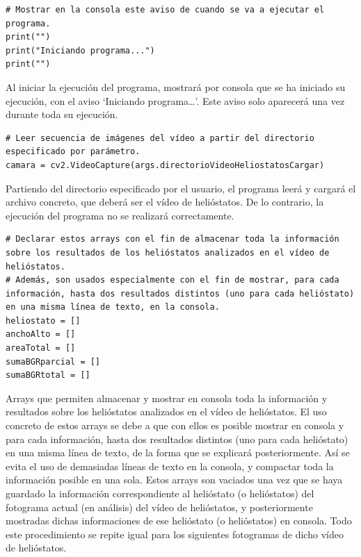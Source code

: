 \begin{lstlisting}
# Mostrar en la consola este aviso de cuando se va a ejecutar el programa.
print("")
print("Iniciando programa...")
print("")
\end{lstlisting}

Al iniciar la ejecución del programa, mostrará por consola que se ha iniciado su ejecución, con el aviso ‘Iniciando programa…’. Este aviso solo aparecerá una vez durante toda su ejecución.\\[20pt]

\begin{lstlisting}
# Leer secuencia de imágenes del vídeo a partir del directorio especificado por parámetro.
camara = cv2.VideoCapture(args.directorioVideoHeliostatosCargar)
\end{lstlisting}

Partiendo del directorio especificado por el usuario, el programa leerá y cargará el archivo concreto, que deberá ser el vídeo de helióstatos. De lo contrario, la ejecución del programa no se realizará correctamente.\\[20pt]

\begin{lstlisting}
# Declarar estos arrays con el fin de almacenar toda la información sobre los resultados de los helióstatos analizados en el vídeo de helióstatos.
# Además, son usados especialmente con el fin de mostrar, para cada información, hasta dos resultados distintos (uno para cada helióstato) en una misma línea de texto, en la consola.
heliostato = []
anchoAlto = []
areaTotal = []
sumaBGRparcial = []
sumaBGRtotal = []
\end{lstlisting}

Arrays que permiten almacenar y mostrar en consola toda la información y resultados sobre los helióstatos analizados en el vídeo de helióstatos. El uso concreto de estos arrays se debe a que con ellos es posible mostrar en consola y para cada información, hasta dos resultados distintos (uno para cada helióstato) en una misma línea de texto, de la forma que se explicará posteriormente. Así se evita el uso de demasiadas líneas de texto en la consola, y compactar toda la información posible en una sola. Estos arrays son vaciados una vez que se haya guardado la información correspondiente al helióstato (o helióstatos) del fotograma actual (en análisis) del vídeo de helióstatos, y posteriormente mostradas dichas informaciones de ese helióstato (o helióstatos) en consola. Todo este procedimiento se repite igual para los siguientes fotogramas de dicho vídeo de helióstatos.\\[20pt]

